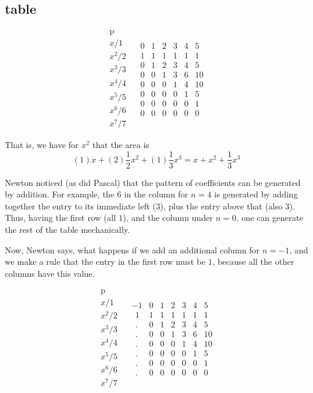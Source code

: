 \documentclass[11pt, oneside]{article}
\begin{document}
\subsection*{table}

\[
\begin{matrix}
\text{p}  \\
x/1  \\
x^2/2 \\
x^3/3 \\
x^4/4 \\
x^5/5 \\
x^6/6 \\
x^7/7
\end{matrix} \ \ \ \
\begin{matrix}
0 & 1 & 2 & 3 & 4 & 5  \\
1 & 1 & 1 & 1 & 1 & 1  \\
0 & 1 & 2 & 3 & 4 & 5 \\
0 & 0 & 1 & 3 & 6 & 10 \\
0 & 0 & 0 & 1 & 4 & 10 \\
0 & 0 & 0 & 0 & 1 & 5 \\
0 & 0 & 0 & 0 & 0 & 1 \\
0 & 0 & 0 & 0 & 0 & 0
\end{matrix}
\]

That is, we have for $x^2$ that the area is
\[ (1)x + (2)\frac{1}{2}x^2 + (1)\frac{1}{3}x^3 = x + x^2 + \frac{1}{3}x^3 \]

Newton noticed (as did Pascal) that the pattern of coefficients can be generated by addition.  For example, the $6$ in the column for $n=4$ is generated by adding together the entry to its immediate left ($3$), plus the entry above that (also $3$).  Thus, having the first row (all $1$), and the column under $n=0$, one can generate the rest of the table mechanically.

Now, Newton says, what happens if we add an additional column for $n=-1$, and we make a rule that the entry in the first row must be $1$, because all the other columns have this value.

\[
\begin{matrix}
\text{p}  \\
x/1  \\
x^2/2 \\
x^3/3 \\
x^4/4 \\
x^5/5 \\
x^6/6 \\
x^7/7
\end{matrix} \ \ \ \
\begin{matrix}
-1 & 0 & 1 & 2 & 3 & 4 & 5  \\
\ \ 1 & 1 & 1 & 1 & 1 & 1 & 1  \\
\ \ . & 0 & 1 & 2 & 3 & 4 & 5 \\
\ \ . & 0 & 0 & 1 & 3 & 6 & 10 \\
\ \ . & 0 & 0 & 0 & 1 & 4 & 10 \\
\ \ . & 0 & 0 & 0 & 0 & 1 & 5 \\
\ \ . & 0 & 0 & 0 & 0 & 0 & 1 \\
\ \ . & 0 & 0 & 0 & 0 & 0 & 0
\end{matrix}
\]
\end{document}
